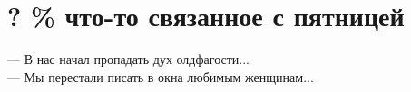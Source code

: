 \section{? \% что-то связанное с пятницей}
\begin{epigraph}
    --- В нас начал пропадать дух олдфагости...\\
    --- Мы перестали писать в окна любимым женщинам...
\end{epigraph}

